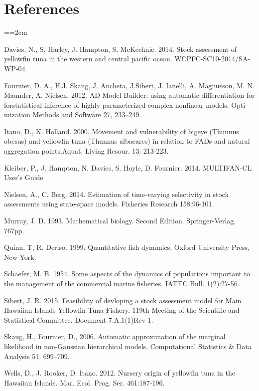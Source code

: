 \documentclass[12pt,letterpaper,twoside]{article}
\newcommand\doublespacing{\baselineskip=1.6\normalbaselineskip}
\begin{document}
\section*{References}
{\parindent=0cm \small
\everypar={\hangindent=2em }\par

Davies, N., S. Harley, J. Hampton, S. McKechnie. 2014. Stock
assessment of yellowfin tuna in the western and central pacific ocean.
WCPFC-SC10-2014/SA-WP-04.

Fournier, D. A., H.J. Skaug, J. Ancheta, J.Sibert, J. Ianelli, 
A. Magnusson, M. N. Maunder, A. Nielsen. 2012. AD Model Builder:
using automatic differentiation for forstatistical inference of highly
parameterized complex nonlinear models. Opti-mization Methods and
Software 27, 233–249.

Itano, D., K. Holland. 2000.  Movement and vulnerability of bigeye
(Thunnus obesus) and yellowfin tuna (Thunnus albacares) in relation to
FADs and natural aggregation points.Aquat. Living Resour. 13: 213-223.

Kleiber, P., J. Hampton, N. Davies, S. Hoyle, D. Fournier. 2014.
MULTIFAN-CL User’s Guide

Nielsen, A., C. Berg. 2014. Estimation of time-varying selectivity
in stock assessments using state-space models. Fisheries Research
158:96-101.

Murray, J. D. 1993. Mathematical biology. Second Edition.
Springer-Verlag. 767pp.

Quinn, T, R. Deriso. 1999. Quantitative fish dynamics. Oxford
University Press, New York.

Schaefer, M. B. 1954. Some aspects of the dynamics of populations
important to the management of the commercial marine fisheries. IATTC
Bull. 1(2):27-56.

Sibert, J. R. 2015. Feasibility of devloping a stock assessment
model for Main Hawaiian Islands Yellowfin Tuna Fishery.
119th Meeting of the Scientific and Statistical Committee.
Document 7.A.1(1)Rev 1.

Skaug, H., Fournier, D., 2006. Automatic approximation of the marginal
likelihood in non-Gaussian hierarchical models. Computational
Statistics \& Data Analysis 51, 699–709.

Wells, D., J. Rooker, D. Itano. 2012.  Nursery origin of yellowfin
tuna in the Hawaiian Islands. Mar. Ecol. Prog. Ser. 461:187-196. 
\par}
\end{document}

